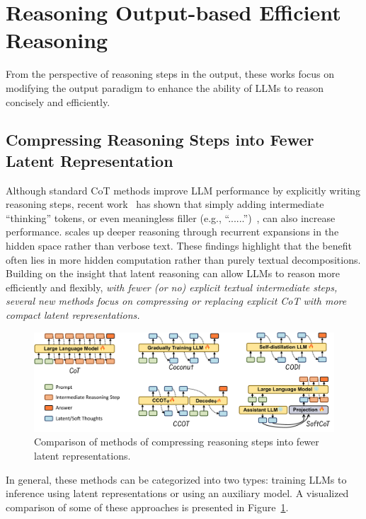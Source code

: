 \section{Reasoning Output-based Efficient Reasoning}
From the perspective of reasoning steps in the output, these works focus on modifying the output paradigm to enhance the ability of LLMs to reason concisely and efficiently.

\subsection{Compressing Reasoning Steps into Fewer Latent Representation}
\label{sec:latent}


Although standard CoT methods improve LLM performance by explicitly writing reasoning steps, recent work~\cite{deng2024explicit} has shown that simply adding intermediate ``thinking'' tokens, or even meaningless filler (e.g., ``......'')~\cite{pfau2024let}, can also increase performance. \cite{geiping2025scaling} scales up deeper reasoning through recurrent expansions in the hidden space rather than verbose text. These findings highlight that the benefit often lies in more hidden computation rather than purely textual decompositions. Building on the insight that latent reasoning can allow LLMs to reason more efficiently and flexibly, \textit{with fewer (or no) explicit textual intermediate steps, several new methods focus on compressing or replacing explicit CoT with more compact latent representations.}


\begin{figure}[h]
    \centering
    \includegraphics[width=\linewidth]{figs/latent.pdf}
    \caption{
    Comparison of methods of compressing reasoning steps into fewer latent representations.}
    \label{fig:latent}
\end{figure}

In general, these methods can be categorized into two types: training LLMs to inference using latent representations or using an auxiliary model. A visualized comparison of some of these approaches is presented in Figure~\ref{fig:latent}.

